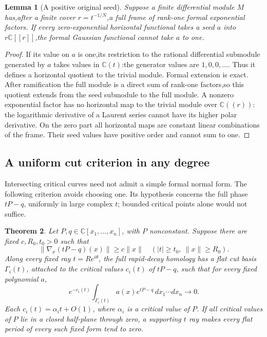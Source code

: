\documentclass[11pt]{article}
\newtheorem{theorem}{Theorem}[section]
\newtheorem{lemma}[theorem]{Lemma}
\theoremstyle{definition}\newtheorem{definition}[theorem]{Definition}
\theoremstyle{remark}\newtheorem{remark}[theorem]{Remark}
\newcommand{\C}{\mathbb C}
\begin{document}
\begin{lemma}[A positive original seed]\label{lem:positiveformal}
Suppose a finite differential module $M$ has,after a finite cover
$r=t^{-1/N}$,a full frame of rank-one formal exponential factors.
If every zero-exponential horizontal functional takes a seed $a$ into
$r\mathbb C[[r]]$,the formal Gaussian functional cannot take $a$ to one.
\end{lemma}
\begin{proof}
If its value on $a$ is one,its restriction to the rational differential
submodule generated by $a$ takes values in $\mathbb C(t)$:the generator
values are $1,0,0,\ldots$. Thus it defines a horizontal quotient to the
trivial module. Formal extension is exact. After ramification the full
module is a direct sum of rank-one factors,so this quotient extends from
the seed submodule to the full module. A nonzero exponential factor
has no horizontal map to the trivial module over $\mathbb C((r))$:
the logarithmic derivative of a Laurent series cannot have its higher
polar derivative. On the zero part all horizontal maps are constant
linear combinations of the frame. Their seed values have positive order
and cannot sum to one.
\end{proof}
\subsection{A uniform cut criterion in any degree}
\label{sec:uniformcutdecay}

Intersecting critical curves need not admit a simple formal normal
form. The following criterion avoids choosing one. Its hypothesis
concerns the full phase $tP-q$, uniformly in large complex $t$;
bounded critical points alone would not suffice.

\begin{theorem}\label{thm:uniformcuts}
Let $P,q\in\C[x_1,\ldots,x_n]$, with $P$ nonconstant. Suppose
there are fixed $c,R_0,t_0>0$ such that
\begin{equation}\label{eq:uniformphasegradient}
 \|\nabla_x(tP-q)(x)\|\ge c\|x\|
       \quad(|t|\ge t_0,\ \|x\|\ge R_0).
\end{equation}
Along every fixed ray $t=Re^{i\theta}$, the full rapid-decay
homology has a flat cut basis $\Gamma_i(t)$, attached to the
critical values $c_i(t)$ of $tP-q$, such that for every fixed
polynomial $a$,
\begin{equation}\label{eq:normalizedcutdecay}
 e^{-c_i(t)}\int_{\Gamma_i(t)}a(x)e^{tP-q}\,
                 dx_1\cdots dx_n\longrightarrow0.
\end{equation}
Each $c_i(t)=\alpha_i t+O(1)$, where $\alpha_i$ is a critical
value of $P$. If all critical values of $P$ lie in a closed
half-plane through zero, a supporting $t$ ray makes every flat
period of every such fixed form tend to zero.
\end{theorem}
\end{document}

